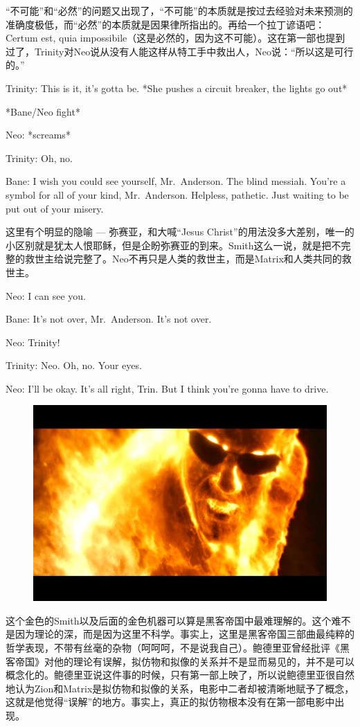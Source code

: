 \documentclass[UTF8]{ctexart}
\newenvironment{myquote}{\color{green} \setlength{\leftskip}{6em} \setlength{\rightskip}{4em} \setlength{\parindent}{-2em}}{\par}
\begin{document}
“不可能”和“必然”的问题又出现了，“不可能”的本质就是按过去经验对未来预测的准确度极低，而“必然”的本质就是因果律所指出的。再给一个拉丁谚语吧：Certum est, quia impossibile（这是必然的，因为这不可能）。这在第一部也提到过了，Trinity对Neo说从没有人能这样从特工手中救出人，Neo说：“所以这是可行的。”

\begin{myquote}
Trinity: This is it, it's gotta be. *She pushes a circuit breaker, the lights go out*

*Bane/Neo fight*

Neo: *screams*

Trinity: Oh, no.

Bane: I wish you could see yourself, Mr.~Anderson. The blind messiah. You're a symbol for all of your kind, Mr.~Anderson. Helpless, pathetic. Just waiting to be put out of your misery.
\end{myquote}

这里有个明显的隐喻 --- 弥赛亚，和大喊“Jesus Christ”的用法没多大差别，唯一的小区别就是犹太人恨耶稣，但是企盼弥赛亚的到来。Smith这么一说，就是把不完整的救世主给说完整了。Neo不再只是人类的救世主，而是Matrix和人类共同的救世主。

\begin{myquote}
Neo: I can see you.

Bane: It's not over, Mr.~Anderson. It's not over.

Neo: Trinity!

Trinity: Neo. Oh, no. Your eyes.

Neo: I'll be okay. It's all right, Trin. But I think you're gonna have to drive.
\end{myquote}

\begin{figure}[htb]
\centering
\includegraphics[width=0.5\linewidth]{fig/f64563d00ca0378fa1ec9c63.jpg}
\end{figure}

这个金色的Smith以及后面的金色机器可以算是黑客帝国中最难理解的。这个难不是因为理论的深，而是因为这里不科学。事实上，这里是黑客帝国三部曲最纯粹的哲学表现，不带有丝毫的杂物（呵呵呵，不是说我自己）。鲍德里亚曾经批评《黑客帝国》对他的理论有误解，拟仿物和拟像的关系并不是显而易见的，并不是可以概念化的。鲍德里亚说这件事的时候，只有第一部上映了，所以说鲍德里亚很自然地认为Zion和Matrix是拟仿物和拟像的关系，电影中二者却被清晰地赋予了概念，这就是他觉得“误解”的地方。事实上，真正的拟仿物根本没有在第一部电影中出现。
\end{document}
